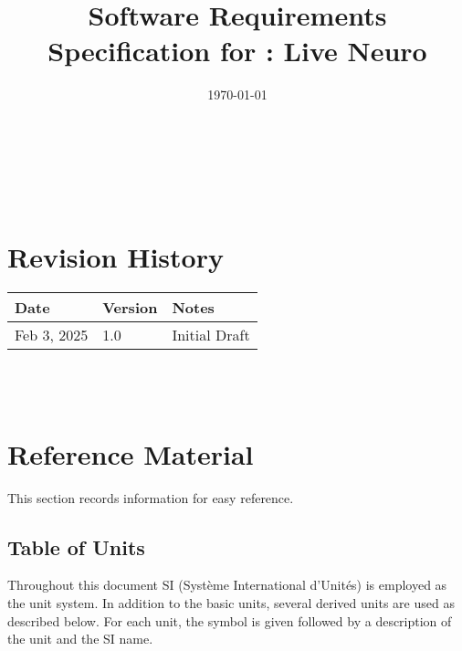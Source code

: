 \documentclass[12pt]{article}
\begin{document}
\title{Software Requirements Specification for \progname: Live Neuro}
\author{\authname}
\date{\today}

\maketitle

~\newpage


\tableofcontents

~\newpage

\section*{Revision History}

\begin{tabularx}{\textwidth}{p{3cm}p{2cm}X}
\toprule {\bf Date} & {\bf Version} & {\bf Notes}\\
\midrule
Feb 3, 2025 & 1.0 & Initial Draft\\
\bottomrule
\end{tabularx}

~\\

~\newpage

\section{Reference Material}

This section records information for easy reference.

\subsection{Table of Units}

Throughout this document SI (Syst\`{e}me International d'Unit\'{e}s) is employed
as the unit system.  In addition to the basic units, several derived units are
used as described below.  For each unit, the symbol is given followed by a
description of the unit and the SI name.
~\newline
\end{document}
